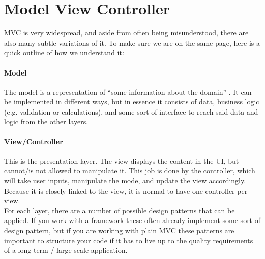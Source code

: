 \section{Model View Controller}
\label{sec:mvc}




MVC is very widespread, and aside from often being misunderstood, there are also many subtle variations of it. To make sure we are on the same page, here is a quick outline of how we understand it:

\paragraph{Model} The model is a representation of “some information about the domain” \cite{fowler}. It can be implemented in different ways, but in essence it consists of data, business logic (e.g. validation or calculations), and some sort of interface to reach said data and logic from the other layers. 

\paragraph{View/Controller} This is the presentation layer. The view displays the content in the UI, but cannot/is not allowed to manipulate it. This job is done by the controller, which will take user inputs, manipulate the mode, and update the view accordingly. Because it is closely linked to the view, it is normal to have one controller per view.\\

For each layer, there are a number of possible design patterns that can be applied. If you work with a framework these often already implement some sort of design pattern, but if you are working with plain MVC these patterns are important to structure your code if it has to live up to the quality requirements of a long term / large scale application.



